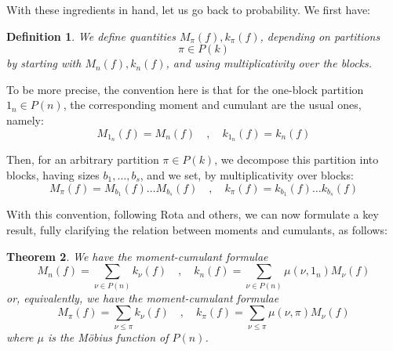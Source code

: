 \documentclass[12pt]{amsbook}
\newtheorem{theorem}{Theorem}[chapter]
\newtheorem{definition}[theorem]{Definition}
\begin{document}
With these ingredients in hand, let us go back to probability. We first have:


\begin{definition}
We define quantities $M_\pi(f),k_\pi(f)$, depending on partitions 
$$\pi\in P(k)$$
by starting with $M_n(f),k_n(f)$, and using multiplicativity over the blocks. 
\end{definition}

To be more precise, the convention here is that for the one-block partition $1_n\in P(n)$, the corresponding moment and cumulant are the usual ones, namely:
$$M_{1_n}(f)=M_n(f)\quad,\quad k_{1_n}(f)=k_n(f)$$

Then, for an arbitrary partition $\pi\in P(k)$, we decompose this partition into blocks, having sizes $b_1,\ldots,b_s$, and we set, by multiplicativity over blocks:
$$M_\pi(f)=M_{b_1}(f)\ldots M_{b_s}(f)\quad,\quad k_\pi(f)=k_{b_1}(f)\ldots k_{b_s}(f)$$

With this convention, following Rota and others, we can now formulate a key result, fully clarifying the relation between moments and cumulants, as follows:


\begin{theorem}
We have the moment-cumulant formulae
$$M_n(f)=\sum_{\nu\in P(n)}k_\nu(f)\quad,\quad 
k_n(f)=\sum_{\nu\in P(n)}\mu(\nu,1_n)M_\nu(f)$$
or, equivalently, we have the moment-cumulant formulae
$$M_\pi(f)=\sum_{\nu\leq\pi}k_\nu(f)\quad,\quad 
k_\pi(f)=\sum_{\nu\leq\pi}\mu(\nu,\pi)M_\nu(f)$$
where $\mu$ is the M\"obius function of $P(n)$.
\end{theorem}
\end{document}
